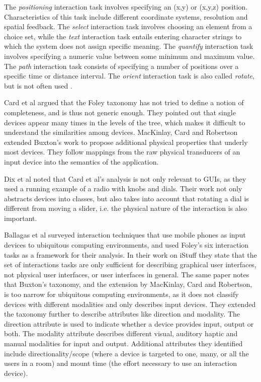 	The \emph{positioning} interaction task involves specifying an (x,y) or (x,y,z) position. Characteristics of this task include different coordinate systems, resolution and spatial feedback. The \emph{select} interaction task involves choosing an element from a choice set, while the \emph{text} interaction task entails entering character strings to which the system does not assign specific meaning. The \emph{quantify} interaction task involves specifying a numeric value between some minimum and maximum value. The \emph{path} interaction task consists of specifying a number of positions over a specific time or distance interval. The \emph{orient} interaction task is also called \emph{rotate}, but is not often used \cite{DeRuiter1988}.
	
	Card et al \cite{Card1991} argued that the Foley taxonomy has not tried to define a notion of completeness, and is thus not generic enough. They pointed out that single devices appear many times in the levels of the tree, which makes it difficult to understand the similarities among devices. MacKinlay, Card and Robertson \cite{MacKinlay1990} extended Buxton's work to propose additional physical properties that underly most devices. They follow mappings from the raw physical transducers of an input device into the semantics of the application.
	
	Dix et al \cite{Dix2008} noted that Card et al's analysis is not only relevant to GUIs, as they used a running example of a radio with knobs and dials. Their work not only abstracts devices into classes, but also takes into account that rotating a dial is different from moving a slider, i.e. the physical nature of the interaction is also important.
	
	
	 Ballagas et al \cite{Ballagas2006} surveyed interaction techniques that use mobile phones as input devices to ubiquitous computing environments, and used Foley's six interaction tasks as a framework for their analysis. In their work on iStuff \cite{Ballagas2003} they state that the set of interactions tasks are only sufficient for describing graphical user interfaces, not physical user interfaces, or user interfaces in general. The same paper notes that Buxton's taxonomy, and the extension by MacKinlay, Card and Robertson, is too narrow for ubiquitous computing environments, as it does not classify devices with different modalities and only describes input devices. They extended the taxonomy further to describe attributes like direction and modality. The direction attribute is used to indicate whether a device provides input, output or both. The modality attribute describes different visual, auditory haptic and manual modalities for input and output. Additional attributes they identified include directionality/scope (where a device is targeted to one, many, or all the users in a room) and mount time (the effort necessary to use an interaction device).
	
